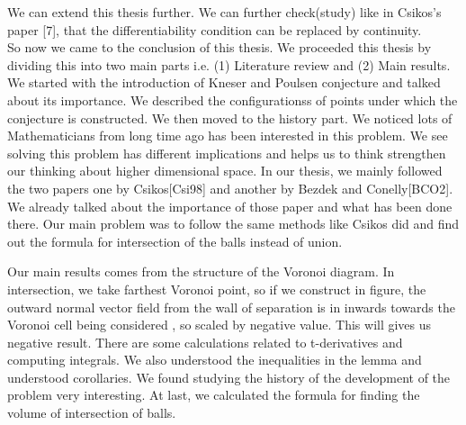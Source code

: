 We can extend this thesis further. We can further check(study) like in Csikos's paper [7], that the differentiability condition can be replaced by continuity.\\


So now we came to the conclusion of this thesis. We proceeded this thesis by dividing this into two main parts i.e. (1) Literature review and (2) Main results. We started with the introduction of Kneser and Poulsen conjecture and talked about its importance. We described the configurationss of points under which the conjecture is constructed. We then moved to the history part. We noticed lots of Mathematicians from long time ago has been interested in this problem. We see solving this problem has different implications and helps us to think strengthen our thinking about higher dimensional space. In our thesis, we mainly followed the two papers one by Csikos[Csi98] and another by Bezdek and Conelly[BCO2]. We already talked about the importance of those paper and what has been done there. Our main problem was to follow the same methods like Csikos did and find out the formula for intersection of the balls instead of union. 

Our main results comes from the structure of the Voronoi diagram. In intersection, we take farthest Voronoi point, so if we construct in figure, the outward normal vector field from the wall of separation is in inwards towards the Voronoi cell being considered , so scaled by negative value. This will gives us negative result. There are some calculations related to t-derivatives and computing integrals. We also understood the inequalities in the lemma and understood corollaries.  We found studying the history of the development of the problem very interesting.  At last, we calculated the formula for finding the volume of intersection of balls.